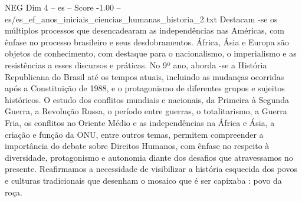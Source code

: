 \begin{textsample}{NEG Dim 4 – es – Score -1.00 – es/es\_ef\_anos\_iniciais\_ciencias\_humanas\_historia\_2.txt}  \label{ex:f4_neg_220}
Destacam -se os múltiplos processos que desencadearam as independências nas Américas, com ênfase no processo brasileiro e seus desdobramentos.
África, Ásia e Europa são objetos de conhecimento, com destaque para o nacionalismo, o imperialismo e as resistências a esses discursos e práticas.
No 9º ano, aborda -se a História Republicana do Brasil até os tempos atuais, incluindo as mudanças ocorridas após a Constituição de 1988, e o protagonismo de diferentes grupos e sujeitos históricos.
O estudo dos conflitos mundiais e nacionais, da Primeira à Segunda Guerra, a Revolução Russa, o período entre guerras, o totalitarismo, a Guerra Fria, os conflitos no Oriente Médio e as independências na África e Ásia, a criação e função da ONU, entre outros temas, permitem compreender a importância do debate sobre Direitos Humanos, com ênfase no respeito à diversidade, protagonismo e autonomia diante dos desafios que atravessamos no presente.
Reafirmamos a necessidade de visibilizar a história esquecida dos povos e culturas tradicionais que desenham o mosaico que é ser capixaba : povo da roça.

\end{textsample}
